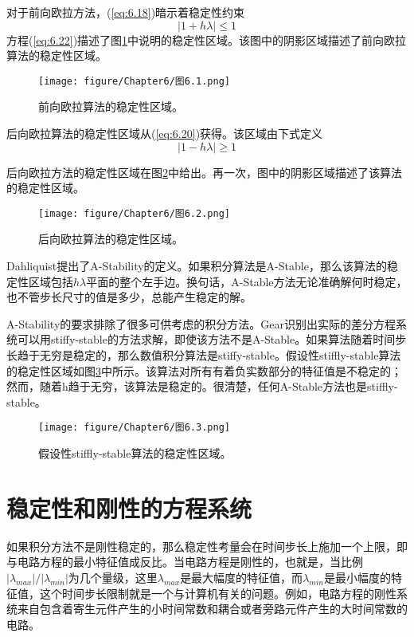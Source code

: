 对于前向欧拉方法，(\ref{eq:6.18})暗示着稳定性约束
\begin{equation}
    |1 + h \lambda| \leq 1
    \label{eq:6.22}
\end{equation}
方程(\ref{eq:6.22})描述了图\ref{图6.1}中说明的稳定性区域。该图中的阴影区域描述了前向欧拉算法的稳定性区域。

\begin{figure}[htbp]
\small
    \centering
    \texttt{[image: figure/Chapter6/图6.1.png]}
    \caption{前向欧拉算法的稳定性区域。}
    \label{图6.1}
\end{figure}

后向欧拉算法的稳定性区域从(\ref{eq:6.20})获得。该区域由下式定义
\begin{equation}
    |1 - h\lambda| \geq 1
    \label{eq:6.23}
\end{equation}

后向欧拉方法的稳定性区域在图\ref{图6.2}中给出。再一次，图中的阴影区域描述了该算法的稳定性区域。

\begin{figure}[htbp]
\small
    \centering
    \texttt{[image: figure/Chapter6/图6.2.png]}
    \caption{后向欧拉算法的稳定性区域。}
    \label{图6.2}
\end{figure}

Dahliquist提出了A-Stability\cite{ref-63}的定义。如果积分算法是A-Stable，那么该算法的稳定性区域包括$h \lambda$平面的整个左手边。换句话，A-Stable方法无论准确解何时稳定，也不管步长尺寸的值是多少，总能产生稳定的解。

A-Stability的要求排除了很多可供考虑的积分方法。Gear\cite{ref-66,ref-67}识别出实际的差分方程系统可以用stiffy-stable的方法求解，即使该方法不是A-Stable。如果算法随着时间步长趋于无穷是稳定的，那么数值积分算法是stiffy-stable。假设性stiffly-stable算法的稳定性区域如图\ref{图6.3}中所示。该算法对所有有着负实数部分的特征值是不稳定的；然而，随着h趋于无穷，该算法是稳定的。很清楚，任何A-Stable方法也是stiffly-stable。

\begin{figure}[htbp]
\small
    \centering
    \texttt{[image: figure/Chapter6/图6.3.png]}
    \caption{假设性stiffly-stable算法的稳定性区域。}
    \label{图6.3}
\end{figure}

\section{稳定性和刚性的方程系统}
如果积分方法不是刚性稳定的，那么稳定性考量会在时间步长上施加一个上限，即与电路方程的最小特征值成反比。当电路方程是刚性的，也就是，当比例$|\lambda_{max}|/|\lambda_{min}|$为几个量级，这里$\lambda_{max}$是最大幅度的特征值，而$\lambda_{min}$是最小幅度的特征值，这个时间步长限制就是一个与计算机有关的问题。例如，电路方程的刚性系统来自包含着寄生元件产生的小时间常数和耦合或者旁路元件产生的大时间常数的电路。

